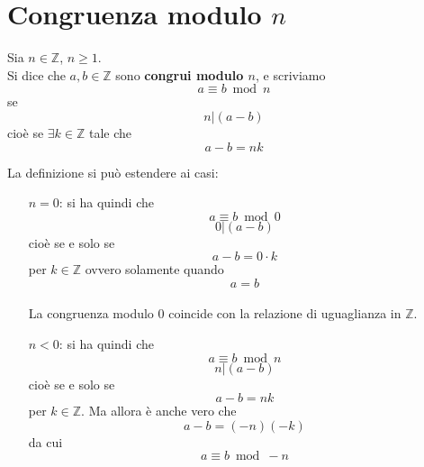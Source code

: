 \documentclass[a4paper,12pt, oneside]{book}
\begin{document}
	\section{Congruenza modulo $n$} 
		\begin{definizione}
			Sia $n \in \mathbb{Z}$, $n \geq 1$.\\
			Si dice che $a,b \in \mathbb{Z}$ sono \textbf{congrui modulo $n$}, e scriviamo $$a \equiv b \bmod n$$
			se
			$$n | (a-b)$$
			cioè se $\exists k \in \mathbb{Z}$ tale che
			$$a-b=nk$$
		\end{definizione}
		\begin{osservazione}
			La definizione si può estendere ai casi: \begin{enumerate}
				\item [$n = 0$: ] si ha quindi che
					$$a \equiv b \bmod 0$$
					$$0|(a-b)$$
					cioè se e solo se $$a-b = 0 \cdot k$$ per $k \in \mathbb{Z}$
					ovvero solamente quando $$a=b$$\\
					La congruenza modulo $0$ coincide con la relazione di uguaglianza in $\mathbb{Z}$.
				\item [$n < 0$: ] si ha quindi che
				$$a \equiv b \bmod n$$
				$$n | (a-b)$$
				cioè se e solo se $$a-b=nk$$ per $k \in \mathbb{Z}$.
				Ma allora è anche vero che $$a-b = (-n)(-k)$$
				da cui $$a \equiv b \bmod -n$$
			\end{enumerate}
		\end{osservazione}
\end{document}
